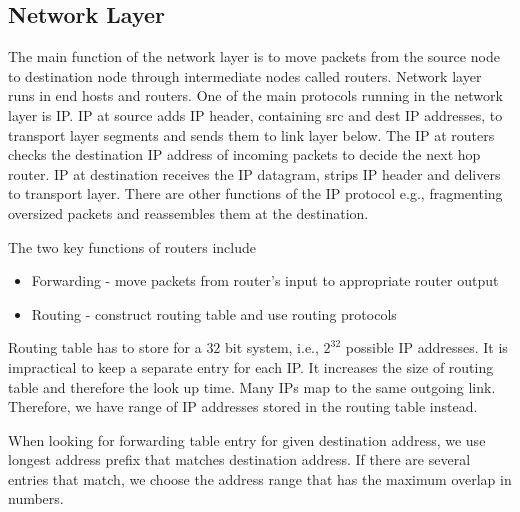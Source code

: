 \documentclass[a4paper]{article}
\theoremstyle{plain}
\theoremstyle{definition}
\newtheorem{defn}{Definition}[section]
\theoremstyle{remark}
\begin{document}
\subsection{Network Layer}
\begin{tcolorbox}[colback=black!3!white,colframe=black!60!white,title=\begin{defn}Main Functions \label{Main Functions}\end{defn}]
The main function of the network layer is to move packets from the source node to destination node through intermediate nodes called routers. Network layer runs in end hosts and routers. One of the main protocols running in the network layer is IP. IP at source adds IP header, containing src and dest IP addresses, to transport layer segments and sends them to link layer below. The IP at routers checks the destination IP address of incoming packets to decide the next hop router. IP at destination receives the IP datagram, strips IP header and delivers to transport layer. There are other functions of the IP protocol e.g., fragmenting oversized packets and reassembles them at the destination.
\end{tcolorbox}
\begin{tcolorbox}[colback=black!3!white,colframe=black!60!white,title=\begin{defn}Two key functions of routers \label{Two key functions of routers}\end{defn}]
The two key functions of routers include
\begin{itemize}
	\item Forwarding - move packets from router's input to appropriate router output
	\item Routing - construct routing table and use routing protocols
\end{itemize}
\end{tcolorbox}
\begin{tcolorbox}[colback=black!3!white,colframe=black!60!white,title=\begin{defn}Routing Table \label{Routing Table}\end{defn}]
Routing table has to store for a $32$ bit system, i.e., $2^{32}$ possible IP addresses. It is impractical to keep a separate entry for each IP. It increases the size of routing table and therefore the look up time. Many IPs map to the same outgoing link. Therefore, we have range of IP addresses stored in the routing table instead.
\end{tcolorbox}
\begin{tcolorbox}[colback=black!3!white,colframe=black!60!white,title=\begin{defn}Longest Prefix Matching \label{Longest Prefix Matching}\end{defn}]
When looking for forwarding table entry for given destination address, we use longest address prefix that matches destination address. If there are several entries that match, we choose the address range that has the maximum overlap in numbers. 
\end{tcolorbox}
\end{document}
